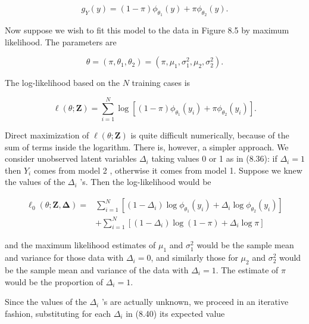 \documentclass[10pt]{article}
\begin{document}
\begin{equation*}
g_{Y}(y)=(1-\pi) \phi_{\theta_{1}}(y)+\pi \phi_{\theta_{2}}(y) . \tag{8.37}
\end{equation*}


Now suppose we wish to fit this model to the data in Figure 8.5 by maximum likelihood. The parameters are


\begin{equation*}
\theta=\left(\pi, \theta_{1}, \theta_{2}\right)=\left(\pi, \mu_{1}, \sigma_{1}^{2}, \mu_{2}, \sigma_{2}^{2}\right) . \tag{8.38}
\end{equation*}


The log-likelihood based on the $N$ training cases is


\begin{equation*}
\ell(\theta ; \mathbf{Z})=\sum_{i=1}^{N} \log \left[(1-\pi) \phi_{\theta_{1}}\left(y_{i}\right)+\pi \phi_{\theta_{2}}\left(y_{i}\right)\right] . \tag{8.39}
\end{equation*}


Direct maximization of $\ell(\theta ; \mathbf{Z})$ is quite difficult numerically, because of the sum of terms inside the logarithm. There is, however, a simpler approach. We consider unobserved latent variables $\Delta_{i}$ taking values 0 or 1 as in (8.36): if $\Delta_{i}=1$ then $Y_{i}$ comes from model 2 , otherwise it comes from model 1. Suppose we knew the values of the $\Delta_{i}$ 's. Then the log-likelihood would be


\begin{align*}
\ell_{0}(\theta ; \mathbf{Z}, \boldsymbol{\Delta})= & \sum_{i=1}^{N}\left[\left(1-\Delta_{i}\right) \log \phi_{\theta_{1}}\left(y_{i}\right)+\Delta_{i} \log \phi_{\theta_{2}}\left(y_{i}\right)\right] \\
& +\sum_{i=1}^{N}\left[\left(1-\Delta_{i}\right) \log (1-\pi)+\Delta_{i} \log \pi\right] \tag{8.40}
\end{align*}


and the maximum likelihood estimates of $\mu_{1}$ and $\sigma_{1}^{2}$ would be the sample mean and variance for those data with $\Delta_{i}=0$, and similarly those for $\mu_{2}$ and $\sigma_{2}^{2}$ would be the sample mean and variance of the data with $\Delta_{i}=1$. The estimate of $\pi$ would be the proportion of $\Delta_{i}=1$.

Since the values of the $\Delta_{i}$ 's are actually unknown, we proceed in an iterative fashion, substituting for each $\Delta_{i}$ in (8.40) its expected value
\end{document}
